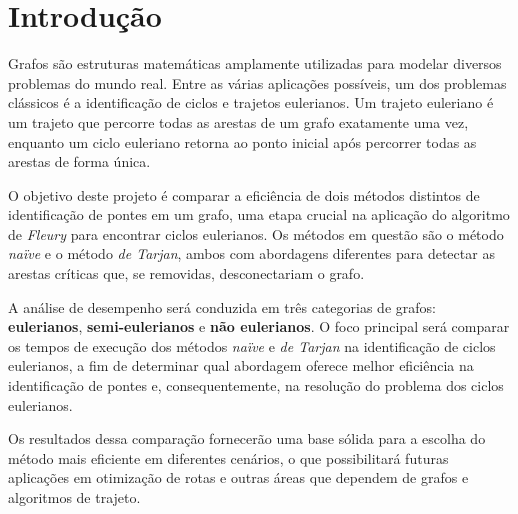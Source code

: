 \section{\esp Introdução}

Grafos são estruturas matemáticas amplamente utilizadas para modelar diversos problemas do mundo real. Entre as várias aplicações possíveis, um dos problemas clássicos é a identificação de ciclos e trajetos eulerianos. Um trajeto euleriano é um trajeto que percorre todas as arestas de um grafo exatamente uma vez, enquanto um ciclo euleriano retorna ao ponto inicial após percorrer todas as arestas de forma única.

O objetivo deste projeto é comparar a eficiência de dois métodos distintos de identificação de pontes em um grafo, uma etapa crucial na aplicação do algoritmo de \textit{Fleury} para encontrar ciclos eulerianos. Os métodos em questão são o método \textit{naïve} e o método \textit{de Tarjan}, ambos com abordagens diferentes para detectar as arestas críticas que, se removidas, desconectariam o grafo.

A análise de desempenho será conduzida em três categorias de grafos: \textbf{eulerianos}, \textbf{semi-eulerianos} e \textbf{não eulerianos}. O foco principal será comparar os tempos de execução dos métodos \textit{naïve} e \textit{de Tarjan} na identificação de ciclos eulerianos, a fim de determinar qual abordagem oferece melhor eficiência na identificação de pontes e, consequentemente, na resolução do problema dos ciclos eulerianos.

Os resultados dessa comparação fornecerão uma base sólida para a escolha do método mais eficiente em diferentes cenários, o que possibilitará futuras aplicações em otimização de rotas e outras áreas que dependem de grafos e algoritmos de trajeto.

